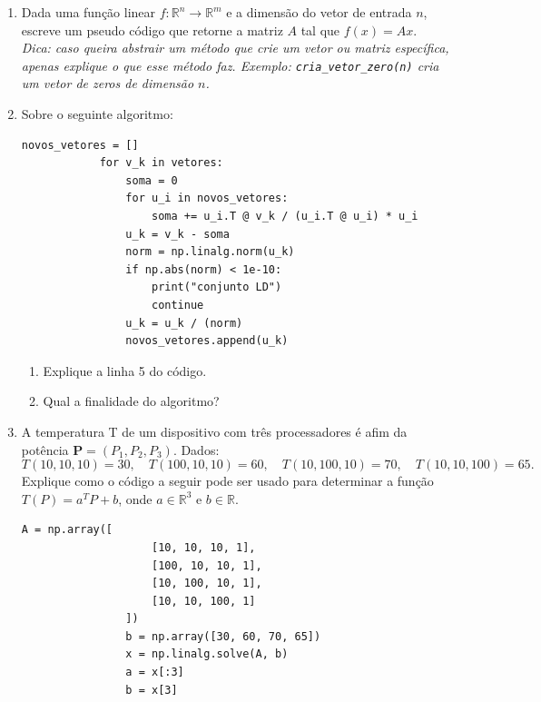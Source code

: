 \documentclass[a4paper,12pt]{article}
\begin{document}
    \begin{enumerate}
        \item Dada uma função linear $f:\mathbb{R}^n \to \mathbb{R}^m$ e a dimensão do vetor de entrada $n$, escreve um pseudo código que retorne a matriz $A$ tal que $f(x) = Ax$.\\
        \textit{Dica: caso queira abstrair um método que crie um vetor ou matriz específica, apenas explique o que esse método faz. Exemplo: \texttt{cria\_vetor\_zero(n)} cria um vetor de zeros de dimensão $n$.}

        \item Sobre o seguinte algoritmo:
        \begin{lstlisting}[gobble=12,caption=Exemplo de código Python]
            novos_vetores = []
            for v_k in vetores:
                soma = 0
                for u_i in novos_vetores:
                    soma += u_i.T @ v_k / (u_i.T @ u_i) * u_i
                u_k = v_k - soma
                norm = np.linalg.norm(u_k)
                if np.abs(norm) < 1e-10:
                    print("conjunto LD")
                    continue
                u_k = u_k / (norm)
                novos_vetores.append(u_k)
        \end{lstlisting}
            \begin{enumerate}
                \item Explique a linha 5 do código.
                \item Qual a finalidade do algoritmo?
            \end{enumerate}
            \item A temperatura T de um dispositivo com três processadores é afim da potência \(\mathbf{P}=(P_1,P_2,P_3)\). Dados:
            $$
            T(10,10,10)=30,\quad T(100,10,10)=60,\quad T(10,100,10)=70,\quad T(10,10,100)=65.
            $$
            Explique como o código a seguir pode ser usado para determinar a função $T(P) = a^T P + b$, onde $a \in \mathbb{R}^3$ e $b \in \mathbb{R}$.
            \begin{lstlisting}[gobble=16]
                A = np.array([
                    [10, 10, 10, 1],
                    [100, 10, 10, 1],
                    [10, 100, 10, 1],
                    [10, 10, 100, 1]
                ])
                b = np.array([30, 60, 70, 65])
                x = np.linalg.solve(A, b)
                a = x[:3]
                b = x[3]
            \end{lstlisting}
    \end{enumerate}
\end{document}
